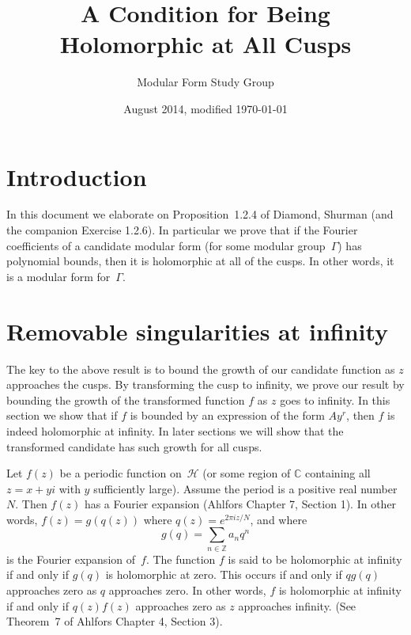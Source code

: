\documentclass {amsart}
\theoremstyle{plain}
\theoremstyle{definition}
\theoremstyle{remark}
\newcommand{\bZ}{{\mathbb{Z}}}
\newcommand{\bC}{{\mathbb{C}}}
\newcommand{\h}{{\mathcal{H}}}
\begin{document}
 

\title{A Condition for Being Holomorphic at All Cusps}

\author{Modular Form Study Group}

\date{August 2014, modified \today}

\maketitle


\section {Introduction}

In this document we elaborate on Proposition~1.2.4 of Diamond, Shurman (and
the companion Exercise 1.2.6). 
In particular we prove that if the Fourier coefficients of a candidate modular form (for some modular group~$\Gamma$) has polynomial bounds, then it is holomorphic at all of the cusps. In other words, it is a modular form for~$\Gamma$.


\section {Removable singularities at infinity}

The key to the above result is to bound the growth of our candidate function as $z$
approaches the cusps. By transforming the cusp to infinity, we prove our result by
bounding the growth of the transformed function $f$ as $z$ goes to infinity. In this section we show that if $f$ is bounded
by an expression of the form $A y^r$, then $f$ is indeed holomorphic at infinity. In later sections
we will show that the transformed candidate has such growth for all cusps.

Let $f(z)$ be a periodic function on~$\h$ (or some region of $\bC$ containing all $z = x + yi$
with $y$ sufficiently large). Assume the period is a positive real number~$N$.
Then $f(z)$ has a Fourier expansion (Ahlfors Chapter 7, Section 1). In other words, $f(z) = g(q(z))$
where $q (z) = e^{2 \pi i z / N}$, and where
$$
g(q) = \sum_{n\in\bZ} a_n q^n
$$
is the Fourier expansion of~$f$.
The function $f$ is said to be holomorphic at infinity if and only if $g(q)$ is holomorphic
at zero. This occurs if and only if $q g(q)$ approaches zero as $q$ approaches zero.
In other words, $f$ is holomorphic at infinity if and only if $q(z) f(z)$ approaches zero as $z$ approaches infinity.
(See Theorem~7 of Ahlfors Chapter 4, Section 3).
\end{document}
